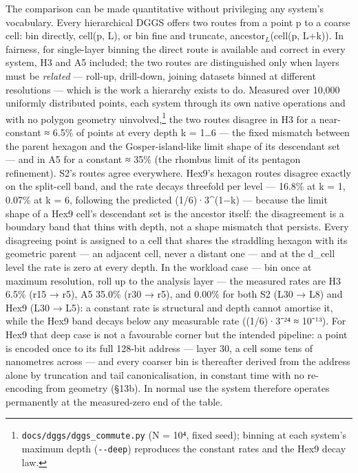 \documentclass[
  11pt,
  a4paper,
]{article}
\begin{document}
The comparison can be made quantitative without privileging any system's
vocabulary. Every hierarchical DGGS offers two routes from a point p to
a coarse cell: bin directly, cell(p, L), or bin fine and truncate,
ancestor\(_L\)(cell(p, L+k)). In fairness, for single-layer binning the
direct route is available and correct in every system, H3 and A5
included; the two routes are distinguished only when layers must be
\emph{related} --- roll-up, drill-down, joining datasets binned at
different resolutions --- which is the work a hierarchy exists to do.
Measured over 10,000 uniformly distributed points, each system through
its own native operations and with no polygon geometry
uinvolved,\footnote{\texttt{docs/dggs/dggs\_commute.py} (N = 10⁴, fixed
  seed); binning at each system's maximum depth (\texttt{-\/-deep})
  reproduces the constant rates and the Hex9 decay law.} the two routes
disagree in H3 for a near-constant ≈ 6.5\% of points at every depth k =
1\ldots6 --- the fixed mismatch between the parent hexagon and the
Gosper-island-like limit shape of its descendant set --- and in A5 for a
constant ≈ 35\% (the rhombus limit of its pentagon refinement). S2's
routes agree everywhere. Hex9's hexagon routes disagree exactly on the
split-cell band, and the rate decays threefold per level --- 16.8\% at k
= 1, 0.07\% at k = 6, following the predicted (1/6)·3\^{}(1−k) ---
because the limit shape of a Hex9 cell's descendant set is the ancestor
itself: the disagreement is a boundary band that thins with depth, not a
shape mismatch that persists. Every disagreeing point is assigned to a
cell that shares the straddling hexagon with its geometric parent --- an
adjacent cell, never a distant one --- and at the d\_cell level the rate
is zero at every depth. In the workload case --- bin once at maximum
resolution, roll up to the analysis layer --- the measured rates are H3
6.5\% (r15 → r5), A5 35.0\% (r30 → r5), and 0.00\% for both S2 (L30 →
L8) and Hex9 (L30 → L5): a constant rate is structural and depth cannot
amortise it, while the Hex9 band decays below any measurable rate
((1/6)·3⁻²⁴ ≈ 10⁻¹³). For Hex9 that deep case is not a favourable corner
but the intended pipeline: a point is encoded once to its full 128-bit
address --- layer 30, a cell some tens of nanometres across --- and
every coarser bin is thereafter derived from the address alone by
truncation and tail canonicalisation, in constant time with no
re-encoding from geometry (§13b). In normal use the system therefore
operates permanently at the measured-zero end of the table.
\end{document}
